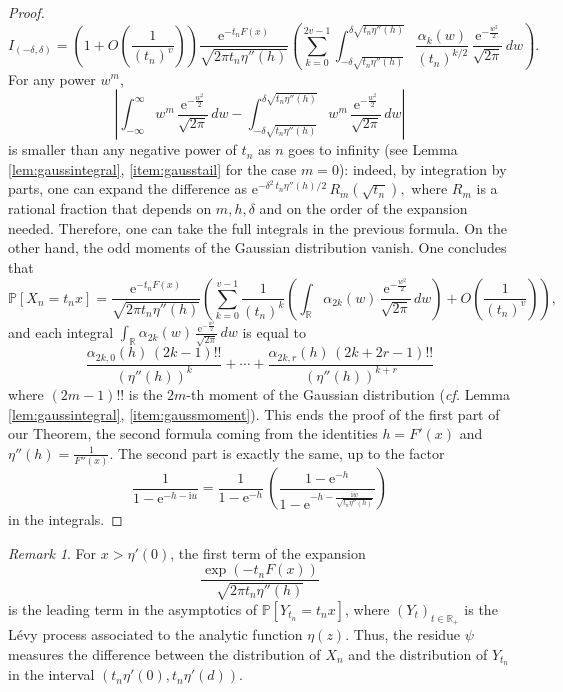 \documentclass[12pt,a4paper,reqno]{amsart}
\theoremstyle{remark}
\newtheorem{remark}[lemma]{Remark}
\newcommand{\R}{\mathbb{R}}
\newcommand{\E}{\mathrm{e}}
\newcommand{\I}{\mathrm{i}}
\newcommand{\proba}{\mathbb{P}}
\begin{document}
\begin{proof}
$$I_{(-\delta,\delta)}=\left(1+O\!\left(\frac{1}{(t_{n})^{v}}\right)\right)\frac{\E^{-t_{n}F(x)}}{\sqrt{2\pi t_{n}\eta''(h)}} \left(\sum_{k=0}^{2v-1} \int_{-\delta \sqrt{t_{n}\eta''(h)}}^{\delta  \sqrt{t_{n}\eta''(h)}} \frac{\alpha_{k}(w)}{(t_{n})^{k/2}}\,\frac{\E^{-\frac{w^{2}}{2}}}{\sqrt{2\pi}}\,dw\right).$$
For any power $w^{m}$,  
$$\left|\int_{-\infty}^{\infty} w^{m} \,\frac{\E^{-\frac{w^{2}}{2}}}{\sqrt{2\pi}}\,dw-\int_{-\delta\sqrt{t_{n}\eta''(h)}}^{\delta\sqrt{t_{n}\eta''(h)}} w^{m}\, \frac{\E^{-\frac{w^{2}}{2}}}{\sqrt{2\pi}}\,dw\right|$$ is smaller than any negative power of $t_{n}$ as $n$ goes to infinity (see Lemma \ref{lem:gaussintegral}, \eqref{item:gausstail} for the case $m=0$): indeed, by integration by parts, one can expand the difference as 
$\E^{-\delta^{2}\,t_{n}\eta''(h)/2}\,R_{m}(\sqrt{t_{n}}),$
where $R_{m}$ is a rational fraction that depends on $m,h,\delta$ and on the order of the expansion needed. Therefore, one can take the full integrals in the previous formula. On the other hand, the odd moments of the Gaussian distribution vanish. One concludes that
$$
\proba[X_{n}=t_{n}x]=\frac{\E^{-t_{n}F(x)}}{\sqrt{2\pi t_{n}\eta''(h)}} \left(\sum_{k=0}^{v-1} \frac{1}{(t_{n})^{k}} \left(\int_{\R} \alpha_{2k}(w)\,\frac{\E^{-\frac{w^{2}}{2}}}{\sqrt{2\pi}}\,dw\right)+O\!\left(\frac{1}{(t_{n})^{v}}\right)\right),$$
and each integral $\int_{\R} \alpha_{2k}(w)\,\frac{\E^{-\frac{w^{2}}{2}}}{\sqrt{2\pi}}\,dw$ is equal to 
$$
\frac{\alpha_{2k,0}(h) \,(2k-1)!!}{(\eta''(h))^{k}}+\cdots+\frac{\alpha_{2k,r}(h) \,(2k+2r-1)!!}{(\eta''(h))^{k+r}}
$$
where $(2m-1)!!$ is the $2m$-th moment of the Gaussian distribution (\emph{cf.} Lemma \ref{lem:gaussintegral}, \eqref{item:gaussmoment}). This ends the proof of the first part of our Theorem, the second formula coming from the identities $h=F'(x)$ and $\eta''(h)=\frac{1}{F''(x)}$. The second part is exactly the same, up to the factor
$$\frac{1}{1-\E^{-h-\I u}}=\frac{1}{1-\E^{-h}}\,\left(\frac{1-\E^{-h}}{1-\E^{-h-\frac{\I w}{\sqrt{t_{n}\eta''(h)}}}}\right)$$
in the integrals.
\end{proof}\medskip

\begin{remark}\label{rem:deviation}
For $x > \eta'(0)$, the first term of the expansion
$$\frac{\exp(-t_{n}F(x))}{\sqrt{2\pi t_{n}\eta''(h)}}$$ 
is the leading term in the asymptotics of $\proba[Y_{t_{n}}=t_{n}x]$, where $(Y_{t})_{t \in \R_{+}}$ is the L\'evy process associated to the analytic function $\eta(z)$. Thus, the residue $\psi$ measures the difference between the distribution of $X_{n}$ and the distribution of $Y_{t_{n}}$ in the interval $(t_{n}\eta'(0),t_{n}\eta'(d))$. 
\end{remark}
\end{document}
